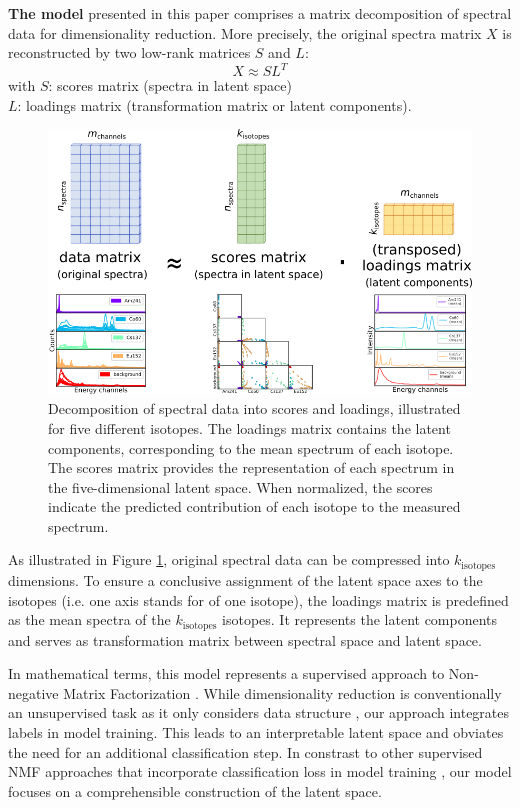 \documentclass[review, 12pt, a4paper]{elsarticle}
\begin{document}
\textbf{The model} presented in this paper comprises a matrix decomposition of spectral data for dimensionality reduction. More precisely, the original spectra matrix $X$ is reconstructed by two low-rank matrices $S$ and $L$:  
$$ X \approx S  L^{T} $$  
with $S$: scores matrix (spectra in latent space) \\  
\hspace*{0.8cm} $L$: loadings matrix (transformation matrix or latent components). \\ 

\begin{figure}
\includegraphics[width=\textwidth]{matrix_decomposition.png}
\caption{Decomposition of spectral data into scores and loadings, illustrated for five different isotopes. The loadings matrix contains the latent components, corresponding to the mean spectrum of each isotope. The scores matrix provides the representation of each spectrum in the five-dimensional latent space. When normalized, the scores indicate the predicted contribution of each isotope to the measured spectrum.}
\label{fig:matrix_decomposition}
\end{figure}

As illustrated in Figure \ref{fig:matrix_decomposition}, original spectral data can be compressed into $k_\mathrm{isotopes}$ dimensions. To ensure a conclusive assignment of the latent space axes to the isotopes (i.e. one axis stands for of one isotope), the loadings matrix is predefined as the mean spectra of the $k_\mathrm{isotopes}$ isotopes. It represents the latent components and serves as transformation matrix between spectral space and latent space.

In mathematical terms, this model represents a supervised approach to Non-negative Matrix Factorization \cite{Shreeves2020, Bilton2019}. While dimensionality reduction is conventionally an unsupervised task as it only considers data structure \cite{Olaya2022}, our approach integrates labels in model training. This leads to an interpretable latent space and obviates the need for an additional classification step. In constrast to other supervised NMF approaches that incorporate classification loss in model training \cite{Leuschner2019, Lee2010, Bisot2016}, our model focuses on a comprehensible construction of the latent space. \\
\end{document}

